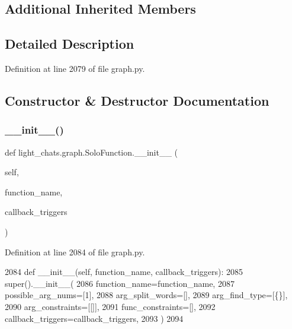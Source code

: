 \subsection*{Additional Inherited Members}


\subsection{Detailed Description}
\begin{DoxyVerb}[Actor]
\end{DoxyVerb}
 

Definition at line 2079 of file graph.\+py.



\subsection{Constructor \& Destructor Documentation}
\mbox{\label{classlight__chats_1_1graph_1_1SoloFunction_a676151788d42d7cd03d41ddacf086598}} 
\subsubsection{\texorpdfstring{\+\_\+\+\_\+init\+\_\+\+\_\+()}{\_\_init\_\_()}}
{\footnotesize\ttfamily def light\+\_\+chats.\+graph.\+Solo\+Function.\+\_\+\+\_\+init\+\_\+\+\_\+ (\begin{DoxyParamCaption}\item[{}]{self,  }\item[{}]{function\+\_\+name,  }\item[{}]{callback\+\_\+triggers }\end{DoxyParamCaption})}



Definition at line 2084 of file graph.\+py.


\begin{DoxyCode}
2084     \textcolor{keyword}{def }\_\_init\_\_(self, function\_name, callback\_triggers):
2085         super().\_\_init\_\_(
2086             function\_name=function\_name,
2087             possible\_arg\_nums=[1],
2088             arg\_split\_words=[],
2089             arg\_find\_type=[\{\}],
2090             arg\_constraints=[[]],
2091             func\_constraints=[],
2092             callback\_triggers=callback\_triggers,
2093         )
2094 
\end{DoxyCode}


